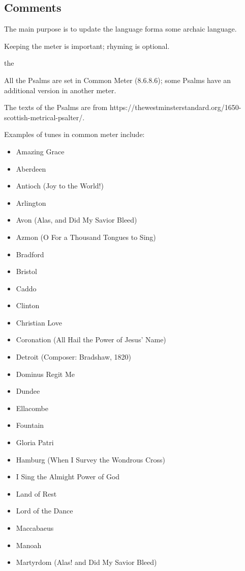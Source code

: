 \subsection*{Comments}

The main purpose is to update the language forma some archaic language.

Keeping the meter is important; rhyming is optional.

the 

All the Psalms are set in Common Meter (8.6.8.6); some Psalms have an additional version in another meter.

The texts of the Psalms are from https://thewestminsterstandard.org/1650-scottish-metrical-psalter/.

Examples of tunes in common meter include:

\begin{itemize}
\sc\item Amazing Grace
  \item Aberdeen
	\item Antioch (\textup{Joy to the World!}) 
	\item Arlington
	\item Avon (Alas, and Did My Savior Bleed)
	\item Azmon (\textup{O For a Thousand Tongues to Sing})
	\item Bradford
	\item Bristol
	\item Caddo
	\item Clinton
	\item Christian Love
	\item Coronation \textup{(All Hail the Power of Jesus' Name)}
	\item Detroit (Composer: Bradshaw, 1820)
	\item Dominus Regit Me
	\item Dundee
	\item Ellacombe
	\item Fountain
	\item Gloria Patri
	\item Hamburg (\textup{When I Survey the Wondrous Cross})
  \item I Sing the Almight Power of God
	\item Land of Rest
	\item Lord of the Dance
	\item Maccabaeus
	\item Manoah
	\item Martyrdom (\textup{Alas! and Did My Savior Bleed})

\end{itemize}
